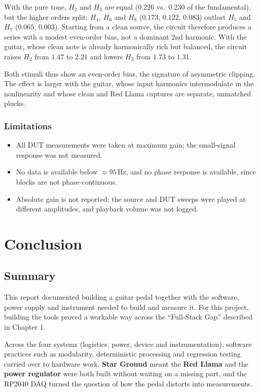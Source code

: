 \documentclass[11pt, a4paper]{report}
\begin{document}
With the pure tone, $H_2$ and $H_3$ are equal ($0.226$ vs.\ $0.230$ of the fundamental), but the higher orders split: $H_4$, $H_6$ and $H_8$ ($0.173$, $0.122$, $0.083$) outlast $H_5$ and $H_7$ ($0.065$, $0.003$). Starting from a clean source, the circuit therefore produces a series with a modest even-order bias, not a dominant 2nd harmonic. With the guitar, whose clean note is already harmonically rich but balanced, the circuit raises $H_2$ from $1.47$ to $2.21$ and lowers $H_3$ from $1.73$ to $1.31$.

Both stimuli thus show an even-order bias, the signature of asymmetric clipping. The effect is larger with the guitar, whose input harmonics intermodulate in the nonlinearity and whose clean and Red Llama captures are separate, unmatched plucks.

\subsection{Limitations}
\begin{itemize}
  \item All DUT measurements were taken at maximum gain; the small-signal response was not measured.
  \item No data is available below $\approx 95$\,Hz, and no phase response is available, since blocks are not phase-continuous.
  \item Absolute gain is not reported: the source and DUT sweeps were played at different amplitudes, and playback volume was not logged.
\end{itemize}

\chapter{Conclusion}

\section{Summary}
This report documented building a guitar pedal together with the software, power supply and instrument needed to build and measure it. For this project, building the tools proved a workable way across the ``Full-Stack Gap'' described in Chapter 1.

Across the four systems (logistics, power, device and instrumentation), software practices such as modularity, deterministic processing and regression testing\cite{pytestregtest,pytest} carried over to hardware work. \textbf{Star Ground} meant the \textbf{Red Llama} and the \textbf{power regulator} were both built without waiting on a missing part, and the RP2040 DAQ turned the question of how the pedal distorts into measurements.
\end{document}
